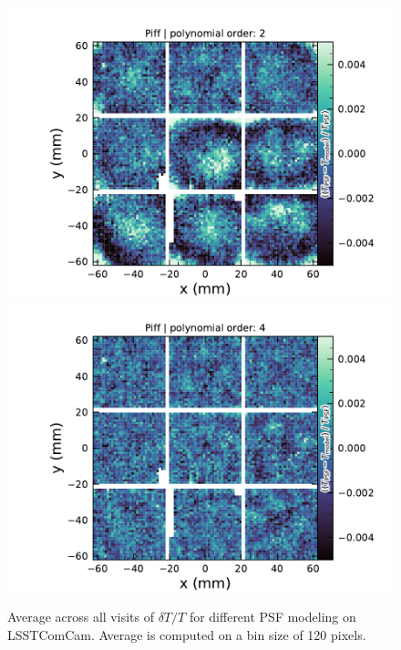 \begin{figure}[htb!]
\centering
\includegraphics[scale=0.29]{figures/dT_T_Piff_poly_order_2.pdf}
\includegraphics[scale=0.29]{figures/dT_T_Piff_poly_order_4.pdf}
\caption{\small Average across all visits of $\delta T/T$  for different PSF modeling on LSSTComCam. Average is computed on a bin size of 120 pixels.}
\label{fig:psf_residuals_fov}
\end{figure}

